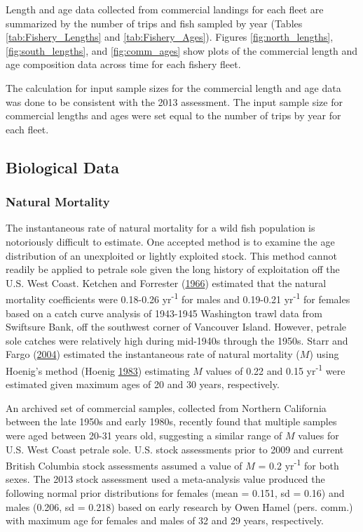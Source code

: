 \documentclass[12pt,]{article}
\begin{document}
Length and age data collected from commercial landings for each fleet
are summarized by the number of trips and fish sampled by year (Tables
\ref{tab:Fishery_Lengths} and \ref{tab:Fishery_Ages}). Figures
\ref{fig:north_lengths}, \ref{fig:south_lengths}, and
\ref{fig:comm_ages} show plots of the commercial length and age
composition data across time for each fishery fleet.

The calculation for input sample sizes for the commercial length and age
data was done to be consistent with the 2013 assessment. The input
sample size for commercial lengths and ages were set equal to the number
of trips by year for each fleet.

\subsection{Biological Data}\label{biological-data}

\subsubsection{Natural Mortality}\label{natural-mortality}

The instantaneous rate of natural mortality for a wild fish population
is notoriously difficult to estimate. One accepted method is to examine
the age distribution of an unexploited or lightly exploited stock. This
method cannot readily be applied to petrale sole given the long history
of exploitation off the U.S. West Coast. Ketchen and Forrester
(\protect\hyperlink{ref-ketchen_population_1966}{1966}) estimated that
the natural mortality coefficients were 0.18-0.26 yr\textsuperscript{-1}
for males and 0.19-0.21 yr\textsuperscript{-1} for females based on a
catch curve analysis of 1943-1945 Washington trawl data from Swiftsure
Bank, off the southwest corner of Vancouver Island. However, petrale
sole catches were relatively high during mid-1940s through the 1950s.
Starr and Fargo (\protect\hyperlink{ref-starr_petrale_2004}{2004})
estimated the instantaneous rate of natural mortality (\(M\)) using
Hoenig's method (Hoenig
\protect\hyperlink{ref-hoenig_empirical_1983}{1983}) estimating \(M\)
values of 0.22 and 0.15 yr\textsuperscript{-1} were estimated given
maximum ages of 20 and 30 years, respectively.

An archived set of commercial samples, collected from Northern
California between the late 1950s and early 1980s, recently found that
multiple samples were aged between 20-31 years old, suggesting a similar
range of \(M\) values for U.S. West Coast petrale sole. U.S. stock
assessments prior to 2009 and current British Columbia stock assessments
assumed a value of \(M\) = 0.2 yr\textsuperscript{-1} for both sexes.
The 2013 stock assessment used a meta-analysis value produced the
following normal prior distributions for females (mean = 0.151, sd =
0.16) and males (0.206, sd = 0.218) based on early research by Owen
Hamel (pers. comm.) with maximum age for females and males of 32 and 29
years, respectively.
\end{document}
